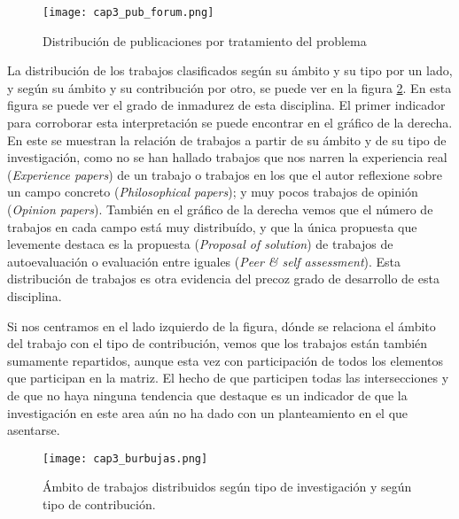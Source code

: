 \begin{figure}[H]
  \begin{center}
    \texttt{[image: cap3\_pub\_forum.png]}
  \end{center}
  \caption{Distribución de publicaciones por tratamiento del problema}
  \label{fig:PublicacionesForum}
\end{figure}


La distribución de los trabajos clasificados según su ámbito y su tipo por un lado, y según su ámbito y su contribución por otro, se puede ver en la figura \ref{fig:Burble}. En esta figura se puede ver el grado de inmadurez de esta disciplina. El primer indicador para corroborar esta interpretación se puede encontrar en el gráfico de la derecha. En este se muestran la relación de trabajos a partir de su ámbito y de su tipo de investigación, como no se han hallado trabajos que nos narren la experiencia real (\emph{Experience papers}) de un trabajo o trabajos en los que el autor reflexione sobre un campo concreto (\emph{Philosophical papers}); y muy pocos trabajos de opinión (\emph{Opinion papers}). También en el gráfico de la derecha vemos que el número de trabajos en cada campo está muy distribuído, y que la única propuesta que levemente destaca es la propuesta (\emph{Proposal of solution}) de trabajos de autoevaluación o evaluación entre iguales (\emph{Peer \& self assessment}). Esta distribución de trabajos es otra evidencia del precoz grado de desarrollo de esta disciplina.

Si nos centramos en el lado izquierdo de la figura, dónde se relaciona el ámbito del trabajo con el tipo de contribución, vemos que los trabajos están también sumamente repartidos, aunque esta vez con participación de todos los elementos que participan en la matriz. El hecho de que participen todas las intersecciones y de que no haya ninguna tendencia que destaque es un indicador de que la investigación en este area aún no ha dado con un planteamiento en el que asentarse.


\begin{landscape}
\begin{figure}[H]
  \begin{center}
    \texttt{[image: cap3\_burbujas.png]}
  \end{center}
  \caption{Ámbito de trabajos distribuidos según tipo de investigación y según tipo de contribución.}
  \label{fig:Burble}
\end{figure}
\end{landscape}


